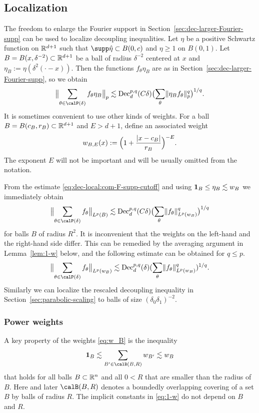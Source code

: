 \subsection{Localization}\label{sec:dec-local}
The freedom to enlarge the Fourier support in Section~\ref{sec:dec-larger-Fourier-supp} can be used to localize decoupling inequalities.
Let $\eta$ be a positive Schwartz function on $\mathbb{R}^{d+1}$ such that $\supp \hat{\eta} \subset B(0,c)$ and $\eta \geq 1$ on $B(0,1)$.
Let $B = B(x,\delta^{-2}) \subset \mathbb{R}^{d+1}$ be a ball of radius $\delta^{-2}$ centered at $x$ and $\eta_{B} := \eta(\delta^{2}(\cdot-x))$.
Then the functions $f_{\theta}\eta_{B}$ are as in Section~\ref{sec:dec-larger-Fourier-supp}, so we obtain
\begin{equation}\label{eq:dec-local:com-F-supp-cutoff}
\norm[\big]{\sum_{\theta \in \Part{\delta}} f_{\theta} \eta_{B}}_{p}
\lesssim
\Dec_{d}^{p,q}(C\delta) \bigl( \sum_{\theta} \norm{\eta_{B} f_{\theta}}_{p}^q \bigr)^{1/q}.
\end{equation}
It is sometimes convenient to use other kinds of weights.
For a ball $B=B(c_B, r_B)\subset \mathbb{R}^{d+1}$ and $E>d+1$, define an associated weight
\begin{equation}\label{eq:w_B}
w_{B, E}(x):=\Bigl( 1+\frac{\lvert x-c_B\rvert}{r_B} \Bigr)^{-E}.
\end{equation}
The exponent $E$ will not be important and will be usually omitted from the notation.

From the estimate \eqref{eq:dec-local:com-F-supp-cutoff} and using $\mathbf{1}_{B} \leq \eta_{B} \lesssim w_{B}$ we immediately obtain
\[
\norm[\big]{\sum_{\theta \in \Part{\delta}} f_{\theta} }_{L^{p}(B)}
\lesssim
\Dec_{d}^{p,q}(C\delta) \bigl( \sum_{\theta} \norm{f_{\theta}}_{L^{p}(w_{B})}^q \bigr)^{1/q}
\]
for balls $B$ of radius $R^{2}$.
It is inconvenient that the weights on the left-hand and the right-hand side differ.
This can be remedied by the averaging argument in Lemma~\ref{lem:1-w} below, and the following estimate can be obtained for $q \leq p$.
\begin{equation}\label{eq:dec-local:w_B}
\norm[\big]{\sum_{\theta \in \Part{\delta}} f_{\theta}}_{L^p(w_{B})}
\lesssim
\Dec_{d}^{p,q}(\delta) (\sum_{\theta} \norm{f_{\theta}}_{L^p(w_{B})}^q)^{1/q}.
\end{equation}
Similarly we can localize the rescaled decoupling inequality in Section~\ref{sec:parabolic-scaling} to balls of size $(\delta_{0}\delta_{1})^{-2}$.

\subsubsection{Power weights}\label{sec:cutoff}
A key property of the weights \eqref{eq:w_B} is the inequality
\begin{equation}
\label{eq:1-w}
\one_B
\lesssim
\sum_{B' \in \calB(B,R)} w_{B'}
\lesssim
w_B
\end{equation}
that holds for all balls $B \subset \mathbb{R}^{n}$ and all $0<R$ that are smaller than the radius of $B$.
Here and later $\calB(B,R)$ denotes a boundedly overlapping covering of a set $B$ by balls of radius $R$.
The implicit constants in \eqref{eq:1-w} do not depend on $B$ and $R$.

